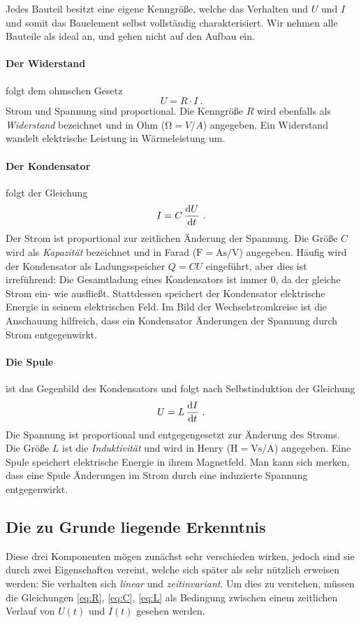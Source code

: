 Jedes Bauteil besitzt eine eigene Kenngröße, welche das Verhalten und $U$ und $I$ und somit das Bauelement selbst vollständig charakterisiert. Wir nehmen alle Bauteile als ideal an, und gehen nicht auf den Aufbau ein.
\paragraph*{Der Widerstand} folgt dem ohmschen Gesetz
\begin{equation}\label{eq:R}
    U = R\cdot I ~.
\end{equation}
Strom und Spannung sind proportional. Die Kenngröße $R$ wird ebenfalls als \emph{Widerstand} bezeichnet und in Ohm ($\si{\ohm} = \si{V}/\si{A}$) angegeben. Ein Widerstand wandelt elektrische Leistung in Wärmeleistung um.
\paragraph*{Der Kondensator}
folgt der Gleichung
\begin{equation}\label{eq:C}
    I = C\,\dv{U}{t} ~.
\end{equation}
Der Strom ist proportional zur zeitlichen Änderung der Spannung. Die Größe $C$ wird als \emph{Kapazität} bezeichnet und in Farad ($\si{\farad} = \si{\ampere\second}/\si{\volt}$) angegeben. Häufig wird der Kondensator als Ladungsspeicher $Q = CU$ eingeführt, aber dies ist irreführend: Die Gesamtladung eines Kondensators ist immer 0, da der gleiche Strom ein- wie ausfließt. Stattdessen speichert der Kondensator elektrische Energie in seinem elektrischen Feld. Im Bild der Wechselstromkreise ist die Anschauung hilfreich, dass ein Kondensator Änderungen der Spannung durch Strom entgegenwirkt.
\paragraph*{Die Spule}
ist das Gegenbild des Kondensators und folgt nach Selbstinduktion der Gleichung
\begin{equation}\label{eq:L}
    U = L\,\dv{I}{t} ~.
\end{equation}
Die Spannung ist proportional und entgegengesetzt zur Änderung des Stroms. Die Größe $L$ ist die \emph{Induktivität} und wird in Henry ($\si{\henry} = \si{\volt\second}/\si{\ampere}$) angegeben. Eine Spule speichert elektrische Energie in ihrem Magnetfeld. Man kann sich merken, dass eine Spule Änderungen im Strom durch eine induzierte Spannung entgegenwirkt.
\subsection{Die zu Grunde liegende Erkenntnis}
Diese drei Komponenten mögen zunächst sehr verschieden wirken, jedoch sind sie durch zwei Eigenschaften vereint, welche sich später als sehr nützlich erweisen werden: Sie verhalten sich \emph{linear} und \emph{zeitinvariant}. Um dies zu verstehen, müssen die Gleichungen \eqref{eq:R}, \eqref{eq:C}, \eqref{eq:L} als Bedingung zwischen einem zeitlichen Verlauf von $U(t)$ und $I(t)$ gesehen werden.

